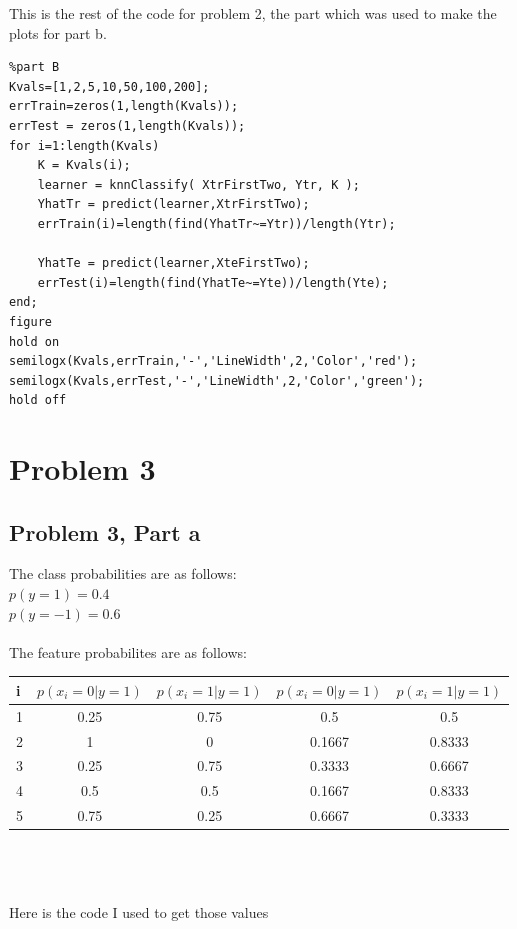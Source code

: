 \documentclass[11pt,psfig]{article}
\begin{document}
\newpage

This is the rest of the code for problem 2, the part which was used to make the plots for part b. 

\begin{verbatim}
%part B
Kvals=[1,2,5,10,50,100,200];
errTrain=zeros(1,length(Kvals));
errTest = zeros(1,length(Kvals));
for i=1:length(Kvals)
    K = Kvals(i);
    learner = knnClassify( XtrFirstTwo, Ytr, K );
    YhatTr = predict(learner,XtrFirstTwo);
    errTrain(i)=length(find(YhatTr~=Ytr))/length(Ytr);
    
    YhatTe = predict(learner,XteFirstTwo);
    errTest(i)=length(find(YhatTe~=Yte))/length(Yte);
end;
figure
hold on
semilogx(Kvals,errTrain,'-','LineWidth',2,'Color','red');
semilogx(Kvals,errTest,'-','LineWidth',2,'Color','green');
hold off
\end{verbatim}

\newpage

\section*{Problem 3}

\subsection*{Problem 3, Part a}

The class probabilities are as follows:\\
$p(y=1) = 0.4$\\
$p(y=-1) = 0.6$\\
\\
The feature probabilites are as follows:\\
\begin{tabular}{ l | c | c | c | c}
  i   & $p(x_i=0|y=1)$ & $p(x_i=1|y=1)$ & $p(x_i=0|y=1)$ & $p(x_i=1|y=1)$\\
\hline
  1 & 0.25 & 0.75 & 0.5 & 0.5 \\
  2 & 1&0 & 0.1667 & 0.8333\\
  3 & 0.25 & 0.75 & 0.3333 & 0.6667\\
  4 & 0.5 & 0.5 & 0.1667 & 0.8333\\
  5 & 0.75 & 0.25 & 0.6667 & 0.3333\\
\end{tabular}
\\
\\
\\
Here is the code I used to get those values
\end{document}
